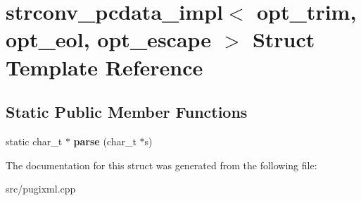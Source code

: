 \hypertarget{structstrconv__pcdata__impl}{}\section{strconv\+\_\+pcdata\+\_\+impl$<$ opt\+\_\+trim, opt\+\_\+eol, opt\+\_\+escape $>$ Struct Template Reference}
\label{structstrconv__pcdata__impl}
\subsection*{Static Public Member Functions}
\begin{DoxyCompactItemize}
\item 
\mbox{\label{structstrconv__pcdata__impl_a0bd2c80c1df06c93d77332a4bb63b5b8}} 
static char\+\_\+t $\ast$ {\bfseries parse} (char\+\_\+t $\ast$s)
\end{DoxyCompactItemize}


The documentation for this struct was generated from the following file\+:\begin{DoxyCompactItemize}
\item 
src/pugixml.\+cpp\end{DoxyCompactItemize}
